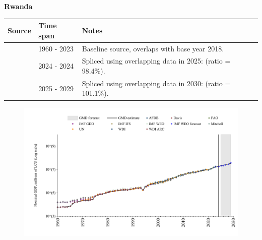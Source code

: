 \documentclass[12pt,a4paper,landscape]{article}
\begin{document}
\begin{adjustbox}{max totalsize={\paperwidth}{\paperheight},center}
\begin{minipage}[t][\textheight][t]{\textwidth}
\vspace*{0.5cm}
{}
\begin{center}
{\Large\bfseries Rwanda}
\end{center}
\vspace{0.5cm}
\begin{table}[H]
\centering
\small
\begin{tabular}{|l|l|l|}
\hline
\textbf{Source} & \textbf{Time span} & \textbf{Notes} \\
\hline
\rowcolor{white}\cite{WDI}& 1960 - 2023 &Baseline source, overlaps with base year 2018.\\
\rowcolor{lightgray}\cite{IMF_IFS}& 2024 - 2024 &Spliced using overlapping data in 2025: (ratio = 98.4\%).\\
\rowcolor{white}\cite{IMF_WEO_forecast}& 2025 - 2029 &Spliced using overlapping data in 2030: (ratio = 101.1\%).\\
\hline
\end{tabular}
\end{table}
\begin{figure}[H]
\centering
\includegraphics[width=\textwidth,height=0.6\textheight,keepaspectratio]{graphs/RWA_nGDP.pdf}
\end{figure}
\end{minipage}
\end{adjustbox}
\end{document}
